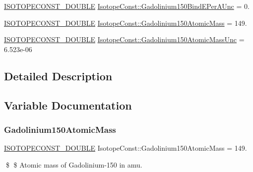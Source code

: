 \begin{DoxyCompactItemize}
\item 
\mbox{\hyperlink{group___isotope_const-_macros_ga8f45a7272ce02c0b4c65c44636ed719a}{I\+S\+O\+T\+O\+P\+E\+C\+O\+N\+S\+T\+\_\+\+D\+O\+U\+B\+LE}} \mbox{\hyperlink{group___isotope_const-_gadolinium-_gd150_ga7e00c8fac7cc9ac83643278d1919e8dc}{Isotope\+Const\+::\+Gadolinium150\+Bind\+E\+Per\+A\+Unc}} = 0.
\item 
\mbox{\hyperlink{group___isotope_const-_macros_ga8f45a7272ce02c0b4c65c44636ed719a}{I\+S\+O\+T\+O\+P\+E\+C\+O\+N\+S\+T\+\_\+\+D\+O\+U\+B\+LE}} \mbox{\hyperlink{group___isotope_const-_gadolinium-_gd150_gaaa42add590610ec55fe22ca01cad0a99}{Isotope\+Const\+::\+Gadolinium150\+Atomic\+Mass}} = 149.
\item 
\mbox{\hyperlink{group___isotope_const-_macros_ga8f45a7272ce02c0b4c65c44636ed719a}{I\+S\+O\+T\+O\+P\+E\+C\+O\+N\+S\+T\+\_\+\+D\+O\+U\+B\+LE}} \mbox{\hyperlink{group___isotope_const-_gadolinium-_gd150_gaa82db42fa8acb7bb90f78cce2151b691}{Isotope\+Const\+::\+Gadolinium150\+Atomic\+Mass\+Unc}} = 6.\+523e-\/06
\end{DoxyCompactItemize}


\subsection{Detailed Description}


\subsection{Variable Documentation}
\mbox{\label{group___isotope_const-_gadolinium-_gd150_gaaa42add590610ec55fe22ca01cad0a99}} 
\subsubsection{\texorpdfstring{Gadolinium150\+Atomic\+Mass}{Gadolinium150AtomicMass}}
{\footnotesize\ttfamily \mbox{\hyperlink{group___isotope_const-_macros_ga8f45a7272ce02c0b4c65c44636ed719a}{I\+S\+O\+T\+O\+P\+E\+C\+O\+N\+S\+T\+\_\+\+D\+O\+U\+B\+LE}} Isotope\+Const\+::\+Gadolinium150\+Atomic\+Mass = 149.}

\$ \$ Atomic mass of Gadolinium-\/150 in amu. \mbox{\label{group___isotope_const-_gadolinium-_gd150_gaa82db42fa8acb7bb90f78cce2151b691}} 
